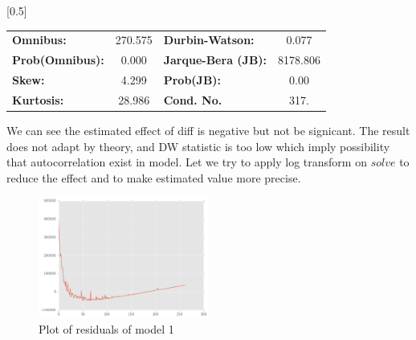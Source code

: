 \documentclass{beamer}
\begin{document}
\begin{frame}
\begin{center}
{\begin{tabular}{lccccc}
\bottomrule
\end{tabular}
}
\scalebox{0.5}[0.5]{
\begin{tabular}{lclc}
\toprule
\textbf{Omnibus:}       & 270.575 & \textbf{  Durbin-Watson:     } &    0.077  \\
\textbf{Prob(Omnibus):} &   0.000 & \textbf{  Jarque-Bera (JB):  } & 8178.806  \\
\textbf{Skew:}          &   4.299 & \textbf{  Prob(JB):          } &     0.00  \\
\textbf{Kurtosis:}      &  28.986 & \textbf{  Cond. No.          } &     317.  \\
\bottomrule
\end{tabular}
}
\end{center}

\end{frame}

\begin{frame}

We can see the estimated effect of diff is negative but not be signicant. The result does not adapt by theory,
and DW statistic is too low which imply possibility that autocorrelation exist in model. 
Let we try to apply log transform on $solve$ to reduce the effect and to make estimated value more precise.

\begin{figure}[h]
\includegraphics[width=0.5\textwidth, inner]{model1-resid.png}
\caption{Plot of residuals of model 1}
\label{fig:f3}
\end{figure}

\end{frame}
\end{document}
